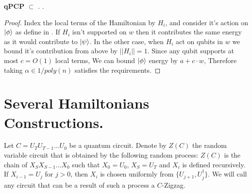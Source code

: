 \documentclass[manuscript,screen,review]{acmart}
\begin{document}
\begin{claim} \textbf{qPCP} $\subset $ \CLASS. .  
\end{claim}
\begin{proof}
  Index the local terms of the Hamiltonian by $H_{i}$, and consider it's action on $\ket{\phi}$ as define in . If $H_{i}$ isn't supported on $w$ then it contributes the same energy as it would contribute to $\ket{\psi}$. In the other case, when $H_{i}$ act on qubits in $w$ we bound it's contribution from above by $||H_{i}|| = 1$. Since any qubit supports at most $c= O(1)$ local terms, We can bound $\ket{\phi}$ energy by $a + c\cdot w$, Therefore taking $\alpha \in 1/poly(n)$ satisfies the requirements.
\end{proof}






\section{Several Hamiltonians Constructions.}

\begin{definition} 
Let $C = U_{T}U_{T-1} \dots U_{0}$ be a quantum circuit. Denote by $Z(C)$ the random variable circuit that is obtained by the following random process: $Z(C)$ is the chain of $X_{S}X_{S-1} \dots X_{0}$ such that $X_{0}=U_{0}$, $X_{S}=U_{T}$ and $X_{i}$ is defined recursively. If $X_{i-1} = U_{j}$ for $j>0$, then $X_{i}$ is chosen uniformly from  $\{ U_{j+1}, U_{j}^{\dagger} \}$. We will call any circuit that can be a result of such a process a $C$-Zigzag.
\end{definition}
\end{document}
